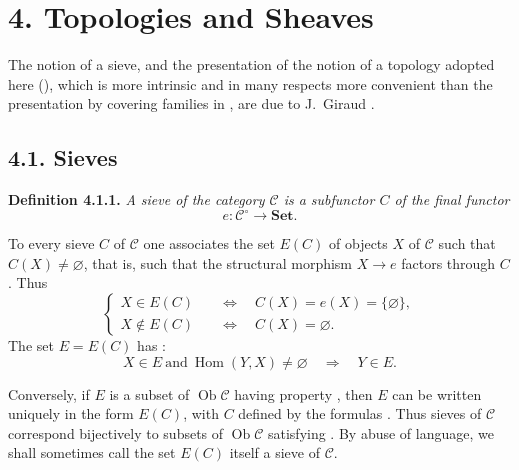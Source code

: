 
\section*{4. Topologies and Sheaves}

The notion of a sieve, and the presentation of the notion of a topology
adopted here (), which is more intrinsic and in many respects more
convenient than the presentation by covering families in , are due to
J.~Giraud .

\subsection*{4.1. Sieves}

\medskip
\noindent{}\textbf{Definition 4.1.1.}
\textit{A \emph{sieve} of the category \(\mathscr C\) is a subfunctor
\(C\) of the final functor}
\[
  e:\mathscr C^{\circ}\longrightarrow\mathbf{Set}.
\]

To every sieve \(C\) of \(\mathscr C\) one associates the set \(E(C)\) of
objects \(X\) of \(\mathscr C\) such that \(C(X)\ne\varnothing\), that is,
such that the structural morphism \(X\to e\) factors through \(C\). Thus
\[
\tag{+}\label{sga3:iv:definition:4:1:1:eq:unnamed:01}
\left\{
\begin{aligned}
 X\in E(C)&\quad\Longleftrightarrow\quad C(X)=e(X)=\{\varnothing\},\\
 X\notin E(C)&\quad\Longleftrightarrow\quad C(X)=\varnothing.
\end{aligned}
\right.
\]
The set \(E=E(C)\) has :
\[
\tag{++}\label{sga3:iv:definition:4:1:1:eq:unnamed:02}
 X\in E\ \text{and}\ \operatorname{Hom}(Y,X)\ne\varnothing
 \quad\Longrightarrow\quad Y\in E.
\]

Conversely, if \(E\) is a subset of \(\operatorname{Ob}\mathscr C\) having
property , then \(E\) can be written uniquely in the form \(E(C)\), with
\(C\) defined by the formulas . Thus sieves of \(\mathscr C\) correspond
bijectively to subsets of \(\operatorname{Ob}\mathscr C\) satisfying .
By abuse of language, we shall sometimes call the set \(E(C)\) itself a
sieve of \(\mathscr C\).


